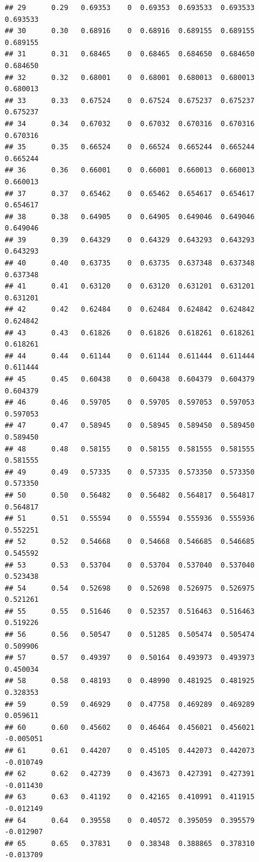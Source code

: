 \documentclass{article}\usepackage[]{graphicx}\usepackage[]{color}
\makeatletter
\newenvironment{kframe}{%
 \def\at@end@of@kframe{}%
 \ifinner\ifhmode%
  \def\at@end@of@kframe{\end{minipage}}%
  \begin{minipage}{\columnwidth}%
 \fi\fi%
 \def\FrameCommand##1{\hskip\@totalleftmargin \hskip-\fboxsep
 \colorbox{shadecolor}{##1}\hskip-\fboxsep
     \hskip-\linewidth \hskip-\@totalleftmargin \hskip\columnwidth}%
 \MakeFramed {\advance\hsize-\width
   \@totalleftmargin\z@ \linewidth\hsize
   \@setminipage}}%
 {\par\unskip\endMakeFramed%
 \at@end@of@kframe}
\newenvironment{knitrout}{}{} %
\makeatother
\begin{document}
\begin{knitrout}
\begin{kframe}
\begin{verbatim}
## 29      0.29   0.69353    0  0.69353  0.693533  0.693533    0.693533
## 30      0.30   0.68916    0  0.68916  0.689155  0.689155    0.689155
## 31      0.31   0.68465    0  0.68465  0.684650  0.684650    0.684650
## 32      0.32   0.68001    0  0.68001  0.680013  0.680013    0.680013
## 33      0.33   0.67524    0  0.67524  0.675237  0.675237    0.675237
## 34      0.34   0.67032    0  0.67032  0.670316  0.670316    0.670316
## 35      0.35   0.66524    0  0.66524  0.665244  0.665244    0.665244
## 36      0.36   0.66001    0  0.66001  0.660013  0.660013    0.660013
## 37      0.37   0.65462    0  0.65462  0.654617  0.654617    0.654617
## 38      0.38   0.64905    0  0.64905  0.649046  0.649046    0.649046
## 39      0.39   0.64329    0  0.64329  0.643293  0.643293    0.643293
## 40      0.40   0.63735    0  0.63735  0.637348  0.637348    0.637348
## 41      0.41   0.63120    0  0.63120  0.631201  0.631201    0.631201
## 42      0.42   0.62484    0  0.62484  0.624842  0.624842    0.624842
## 43      0.43   0.61826    0  0.61826  0.618261  0.618261    0.618261
## 44      0.44   0.61144    0  0.61144  0.611444  0.611444    0.611444
## 45      0.45   0.60438    0  0.60438  0.604379  0.604379    0.604379
## 46      0.46   0.59705    0  0.59705  0.597053  0.597053    0.597053
## 47      0.47   0.58945    0  0.58945  0.589450  0.589450    0.589450
## 48      0.48   0.58155    0  0.58155  0.581555  0.581555    0.581555
## 49      0.49   0.57335    0  0.57335  0.573350  0.573350    0.573350
## 50      0.50   0.56482    0  0.56482  0.564817  0.564817    0.564817
## 51      0.51   0.55594    0  0.55594  0.555936  0.555936    0.552251
## 52      0.52   0.54668    0  0.54668  0.546685  0.546685    0.545592
## 53      0.53   0.53704    0  0.53704  0.537040  0.537040    0.523438
## 54      0.54   0.52698    0  0.52698  0.526975  0.526975    0.521261
## 55      0.55   0.51646    0  0.52357  0.516463  0.516463    0.519226
## 56      0.56   0.50547    0  0.51285  0.505474  0.505474    0.509906
## 57      0.57   0.49397    0  0.50164  0.493973  0.493973    0.450034
## 58      0.58   0.48193    0  0.48990  0.481925  0.481925    0.328353
## 59      0.59   0.46929    0  0.47758  0.469289  0.469289    0.059611
## 60      0.60   0.45602    0  0.46464  0.456021  0.456021   -0.005051
## 61      0.61   0.44207    0  0.45105  0.442073  0.442073   -0.010749
## 62      0.62   0.42739    0  0.43673  0.427391  0.427391   -0.011430
## 63      0.63   0.41192    0  0.42165  0.410991  0.411915   -0.012149
## 64      0.64   0.39558    0  0.40572  0.395059  0.395579   -0.012907
## 65      0.65   0.37831    0  0.38348  0.388865  0.378310   -0.013709

\end{verbatim}
\end{kframe}
\end{knitrout}
\end{document}
